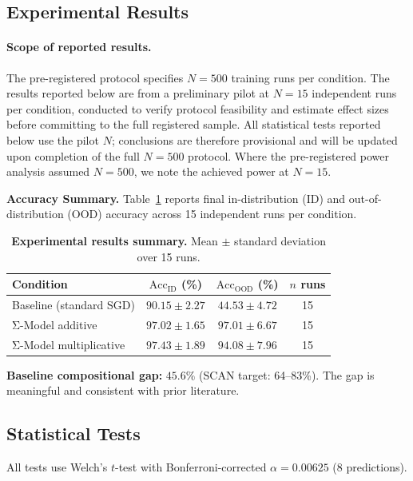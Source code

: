 \documentclass[11pt,a4paper]{article}
\begin{document}
\subsection{Experimental Results}

\paragraph{Scope of reported results.}
The pre-registered protocol specifies $N = 500$ training runs per
condition. The results reported below are from a preliminary pilot at
$N = 15$ independent runs per condition, conducted to verify protocol
feasibility and estimate effect sizes before committing to the full
registered sample. All statistical tests reported below use the pilot
$N$; conclusions are therefore provisional and will be updated upon
completion of the full $N = 500$ protocol. Where the pre-registered
power analysis assumed $N = 500$, we note the achieved power at
$N = 15$.

\textbf{Accuracy Summary.} Table~\ref{tab:results-summary} reports
final in-distribution (ID) and out-of-distribution (OOD) accuracy
across 15 independent runs per condition.

\begin{table}[htbp]
\centering
\caption{\textbf{Experimental results summary.} Mean $\pm$ standard
deviation over 15 runs.}
\label{tab:results-summary}
\begin{tabular}{l c c c}
\toprule
\textbf{Condition} & \textbf{$\text{Acc}_{\text{ID}}$ (\%)} & \textbf{$\text{Acc}_{\text{OOD}}$ (\%)} & \textbf{$n$ runs} \\
\midrule
Baseline (standard SGD) & $90.15 \pm 2.27$ & $44.53 \pm 4.72$ & 15 \\
Σ-Model additive & $97.02 \pm 1.65$ & $97.01 \pm 6.67$ & 15 \\
Σ-Model multiplicative & $97.43 \pm 1.89$ & $94.08 \pm 7.96$ & 15 \\
\bottomrule
\end{tabular}
\end{table}

\textbf{Baseline compositional gap:} $45.6\%$ (SCAN target: 64--83\%).
The gap is meaningful and consistent with prior literature.

\subsection{Statistical Tests}

All tests use Welch's $t$-test with Bonferroni-corrected
$\alpha = 0.00625$ (8 predictions).
\end{document}
